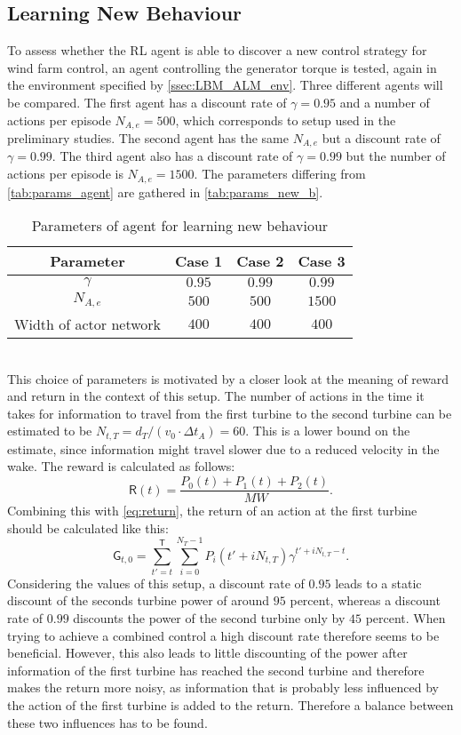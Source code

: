 \subsection{Learning New Behaviour}
\label{ssec:new_behaviour_description}
To assess whether the RL agent is able to discover a new control strategy for wind farm control, an agent controlling the generator torque is tested, again in the environment specified by \autoref{ssec:LBM_ALM_env}. Three different agents will be compared. The first agent has a discount rate of $\gamma = 0.95$ and a number of actions per episode $N_{A,e} = 500$, which corresponds to setup used in the preliminary studies. The second agent has the same $N_{A,e}$ but a discount rate of $\gamma = 0.99$. The third agent also has a discount rate of $\gamma = 0.99$ but the number of actions per episode is $N_{A,e} = 1500$. The parameters differing from \autoref{tab:params_agent} are gathered in \autoref{tab:params_new_b}. 
\begin{table}[h]
	\centering
	\caption{Parameters of agent for learning new behaviour}
	\begin{tabular}{cccc}
		\toprule 
		Parameter & Case 1 & Case 2 & Case 3 \\ 
		\midrule
		$\gamma$ & $0.95$ & $0.99$ & $0.99$ \\ 
		$N_{A,e}$ & $500$ & $500$ & $1500$ \\ 
		Width of actor network & $400$ & $400$ & $400$ \\
		\bottomrule
	\end{tabular}
	\label{tab:params_new_b}
\end{table}\\
This choice of parameters is motivated by a closer look at the meaning of reward and return in the context of this setup. The number of actions in the time it takes for information to travel from the first turbine to the second turbine can be estimated to be $N_{t,T} = d_T/(v_0 \cdot \Delta t_A) = 60$. This is a lower bound on the estimate, since information might travel slower due to a reduced velocity in the wake. The reward is calculated as follows: 
\begin{equation} 
\mathsf{R}(t) = \frac{P_0(t) + P_1(t) + P_2(t)}{\SI{}{MW}}.
\end{equation} Combining this with \eqref{eq:return}, the return of an action at the first turbine should be calculated like this:
\begin{equation}
	\mathsf{G}_{t,0} = \sum^\mathsf{T}_{t'=t} \sum_{i=0}^{N_T-1}P_i(t'+iN_{t,T})\gamma^{t'+iN_{t,T}-t}.
\end{equation}
Considering the values of this setup, a discount rate of $0.95$ leads to a static discount of the seconds turbine power of around $95$ percent, whereas a discount rate of $0.99$ discounts the power of the second turbine only by $45$ percent. When trying to achieve a combined control a high discount rate therefore seems to be beneficial. However, this also leads to little discounting of the power after information of the first turbine has reached the second turbine and therefore makes the return more noisy, as information that is probably less influenced by the action of the first turbine is added to the return. Therefore a balance between these two influences has to be found.


